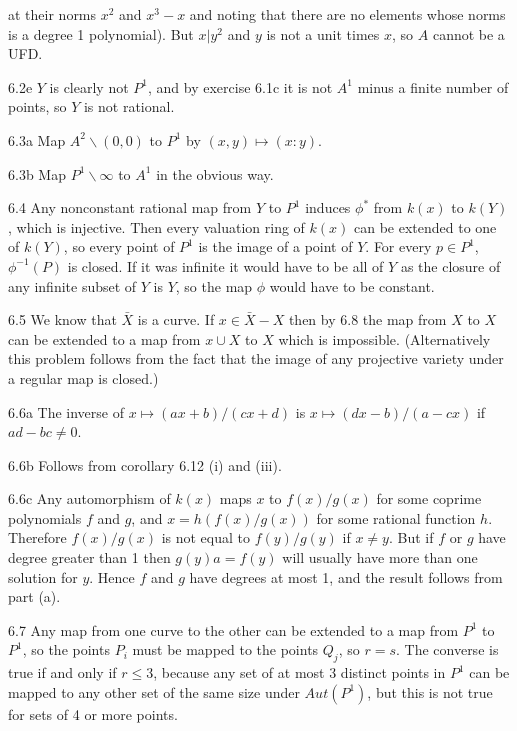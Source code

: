 at their norms $x^2$ and $x^3-x$ and noting that 
there are no elements whose norms is a degree 1 polynomial). 
But $x|y^2$ and $y$ is not a unit times $x$, so $A$ cannot be a UFD. 
\item{6.2e} $Y$ is clearly not $P^1$, and by exercise 6.1c
it is not $A^1$ minus a finite number of points, so
$Y$ is not rational. 
\item{6.3a} Map $A^2\backslash (0,0)$ to $P^1$ 
by $(x,y)\mapsto (x:y)$. 
\item{6.3b} Map $P^1\backslash \infty$ to $A^1$ in the
obvious way. 
\item{6.4} Any nonconstant rational map from 
$Y$ to $P^1$ induces $\phi^*$ from $k(x)$ to $k(Y)$, which is
injective.  Then every valuation ring of $k(x)$ can be extended to one
of $k(Y)$, so every point of $P^1$ is the image of a point of $Y$. For
every $p\in P^1$, $\phi^{-1}(P)$ is closed. If it was infinite it
would have to be all of $Y$ as the closure of any infinite subset of
$Y$ is $Y$, so the map $\phi$ would have to be constant.
\item{6.5} We know that $\bar X$ is a curve. If $x\in \bar X-X$ then
by 6.8 the map from $X$ to $X$ can be extended to 
a map from $x\cup X$ to $X$ which is impossible. (Alternatively 
this problem follows from the fact that the image of
any projective variety under a regular map is closed.)
\item{6.6a} The inverse of $x\mapsto (ax+b)/(cx+d)$
is $x\mapsto (dx-b)/(a-cx)$ if $ad-bc\ne 0$. 
\item{6.6b} Follows from corollary 6.12 (i) and (iii). 
\item{6.6c} Any automorphism of $k(x) $
maps $x$ to $f(x)/g(x)$ for some coprime polynomials $f$ and $g$,
and $x=h(f(x)/g(x))$ for some rational function $h$. Therefore
$f(x)/g(x)$ is not equal to $f(y)/g(y)$ if $x\ne y$. But if
$f$ or $g$ have degree greater than 1 then $g(y)a=f(y)$
will usually have more than one solution for $y$. Hence
$f$ and $g$ have degrees at most 1, and the result follows
from part (a).
\item{6.7} Any map from one curve to the other can be extended
to a map from $P^1$ to $P^1$, so the points $P_i$
must be mapped to the points $Q_j$, so $r=s$. The converse is true
if and only if $r\le 3$, because any set of at most 3 distinct points in $P^1$ 
can be mapped to any other set of the same size under $Aut(P^1)$, 
but this is not true for sets of 4 or more points. 
\bye

